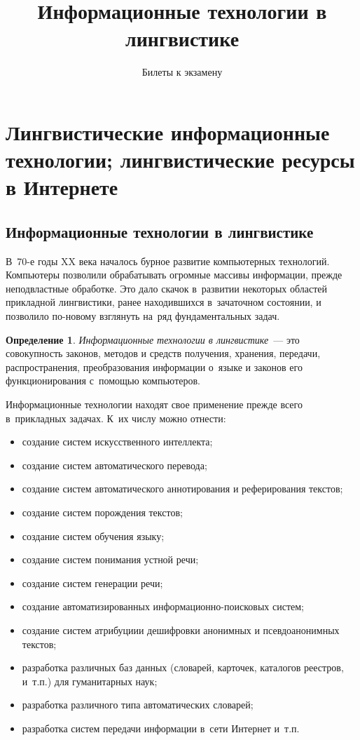 \documentclass[12pt]{article}
\theoremstyle{definition}
\newtheorem*{defn}{Определение}
\theoremstyle{remark}
\numberwithin{equation}{section}
\begin{document}
\title{Информационные технологии в лингвистике}%
\author{Билеты к экзамену}%
\date{}
\maketitle
\tableofcontents

\section{Лингвистические информационные технологии; лингвистические ресурсы в Интернете}
\subsection{Информационные технологии в лингвистике}
В~70-е годы XX века началось бурное развитие компьютерных технологий.
Компьютеры позволили обрабатывать огромные массивы информации, прежде
неподвластные обработке. Это дало скачок в~развитии некоторых областей
прикладной лингвистики, ранее находившихся в~зачаточном состоянии, и
позволило по-новому взглянуть на~ряд фундаментальных задач.
\begin{defn}
    {\sl Информационные технологии в лингвистике}~--- это совокупность
    законов, методов и средств получения, хранения, передачи,
    распространения, преобразования информации о~языке и законов
    его функционирования с~помощью компьютеров.
\end{defn}

Информационные технологии находят свое применение прежде всего
в~прикладных задачах. К~их числу можно отнести:
\begin{itemize}
    \item создание систем искусственного интеллекта;
    \item создание систем автоматического перевода;
    \item создание систем автоматического аннотирования и реферирования
    текстов;
    \item создание систем порождения текстов;
    \item создание систем обучения языку;
    \item создание систем понимания устной речи;
    \item создание систем генерации речи;
    \item создание автоматизированных информационно-поисковых систем;
    \item создание систем атрибуциии дешифровки анонимных и
    псевдоанонимных текстов;
    \item разработка различных баз данных (словарей, карточек, каталогов
    реестров, и~т.п.) для гуманитарных наук;
    \item разработка различного типа автоматических словарей;
    \item разработка систем передачи информации в~сети Интернет и~т.п.
\end{itemize}
\end{document}
